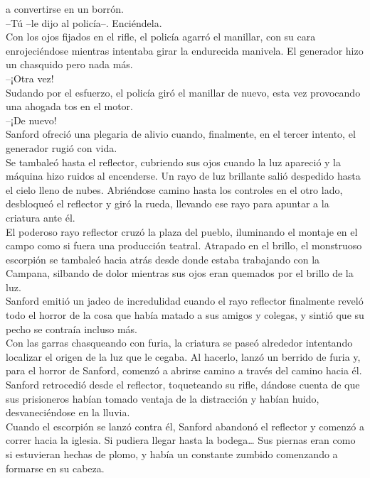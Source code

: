 a convertirse en un borrón.\\
--Tú --le dijo al policía--. Enciéndela.\\
Con los ojos fijados en el rifle, el policía agarró el manillar, con su
cara enrojeciéndose mientras intentaba girar la endurecida manivela. El
generador hizo un chasquido pero nada más.\\
--¡Otra vez!\\
Sudando por el esfuerzo, el policía giró el manillar de nuevo, esta vez
provocando una ahogada tos en el motor.\\
--¡De nuevo!\\
Sanford ofreció una plegaria de alivio cuando, finalmente, en el tercer
intento, el generador rugió con vida.\\
Se tambaleó hasta el reflector, cubriendo sus ojos cuando la luz
apareció y la máquina hizo ruidos al encenderse. Un rayo de luz
brillante salió despedido hasta el cielo lleno de nubes. Abriéndose
camino hasta los controles en el otro lado, desbloqueó el reflector y
giró la rueda, llevando ese rayo para apuntar a la criatura ante él.\\
El poderoso rayo reflector cruzó la plaza del pueblo, iluminando el
montaje en el campo como si fuera una producción teatral. Atrapado en el
brillo, el monstruoso escorpión se tambaleó hacia atrás desde donde
estaba trabajando con la Campana, silbando de dolor mientras sus ojos
eran quemados por el brillo de la luz.\\
Sanford emitió un jadeo de incredulidad cuando el rayo reflector
finalmente reveló todo el horror de la cosa que había matado a sus
amigos y colegas, y sintió que su pecho se contraía incluso más.\\
Con las garras chasqueando con furia, la criatura se paseó alrededor
intentando localizar el origen de la luz que le cegaba. Al hacerlo,
lanzó un berrido de furia y, para el horror de Sanford, comenzó a
abrirse camino a través del camino hacia él.\\
Sanford retrocedió desde el reflector, toqueteando su rifle, dándose
cuenta de que sus prisioneros habían tomado ventaja de la distracción y
habían huido, desvaneciéndose en la lluvia.\\
Cuando el escorpión se lanzó contra él, Sanford abandonó el reflector y
comenzó a correr hacia la iglesia. Si pudiera llegar hasta la
bodega\ldots{} Sus piernas eran como si estuvieran hechas de plomo, y
había un constante zumbido comenzando a formarse en su cabeza.\\
